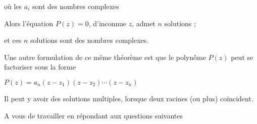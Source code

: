 où les $a_i$ sont des nombres complexes


Alors l'équation $P(z)=0$, d'inconnue $z$, admet $n$ solutions ;

 et ces $n$ solutions sont des nombres complexes.

\change

Une autre formulation de ce même théorème est que le polynôme $P(z)$
peut se factoriser sous la forme 

$P(z) = a_n(z-z_1)(z-z_2)\cdots(z-z_n)$

Il peut y avoir des solutions multiples, lorsque deux racines (ou plus)
coïncident.

\diapo

A vous de travailler en répondant aux questions suivantes

